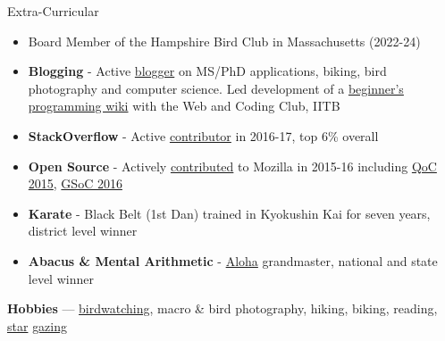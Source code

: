 \documentclass{resume} %
\begin{document}
\begin{rSection}{Extra-Curricular}
\begin{itemize}[leftmargin=*]
\item Board Member of the Hampshire Bird Club in Massachusetts (2022-24)
\item \textbf{Blogging} - Active \href{http://martiansideofthemoon.github.io/archive.html}{blogger} on MS/PhD applications, biking, bird photography and computer science. Led development of a \href{https://www.wncc-iitb.org/wiki/index.php/The_Web_and_Coding_Club}{beginner's programming wiki} with the Web and Coding Club, IITB
\item \textbf{StackOverflow} - Active \href{https://stackoverflow.com/users/5080995/martianwars}{contributor} in 2016-17, top 6\% overall
\item \textbf{Open Source} - Actively \href{http://martiansideofthemoon.github.io/open_source/}{contributed} to Mozilla in 2015-16 including \href{https://wiki.mozilla.org/Auto-tools/New_Contributor/Quarter_of_Contribution}{QoC 2015}, \href{https://summerofcode.withgoogle.com/archive/2016/projects/}{GSoC 2016}
\item \textbf{Karate} - Black Belt (1st Dan) trained in Kyokushin Kai for seven years, district level winner
\item \textbf{Abacus \& Mental Arithmetic} - \href{https://alohamindmath.com/}{Aloha} grandmaster, national and state level winner
\end{itemize}
\textbf{Hobbies} --- \href{https://martiansideofthemoon.github.io/birding/}{birdwatching}, macro \& bird photography, hiking, biking, reading, \href{https://twitter.com/4cast4you/status/1639131581939077120}{star} \href{https://www.cbsnews.com/boston/news/northern-lights-captivate-stargazers-across-massachusetts/}{gazing}
\end{rSection}
\end{document}
